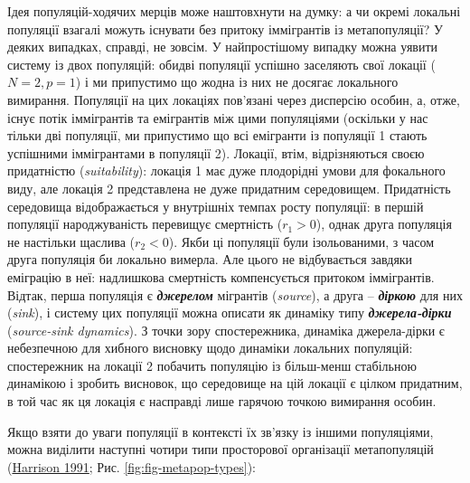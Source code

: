 \documentclass[
  11pt,
]{book}
\begin{document}
Ідея популяцій-ходячих мерців може наштовхнути на думку: а чи окремі локальні популяції взагалі можуть існувати без притоку іммігрантів із метапопуляції? У деяких випадках, справді, не зовсім. У найпростішому випадку можна уявити систему із двох популяцій: обидві популяції успішно заселяють свої локації (\(N = 2, p=1\)) і ми припустимо що жодна із них не досягає локального вимирання. Популяції на цих локаціях пов'язані через дисперсію особин, а, отже, існує потік іммігрантів та емігрантів між цими популяціями (оскільки у нас тільки дві популяції, ми припустимо що всі емігранти із популяції 1 стають успішними іммігрантами в популяції 2). Локації, втім, відрізняються своєю придатністю (\emph{suitability}): локація 1 має дуже плодорідні умови для фокального виду, але локація 2 представлена не дуже придатним середовищем. Придатність середовища відображається у внутрішніх темпах росту популяції: в першій популяції народжуваність перевищує смертність (\(r_1 > 0\)), однак друга популяція не настільки щаслива (\(r_2 < 0\)). Якби ці популяції були ізольованими, з часом друга популяція би локально вимерла. Але цього не відбувається завдяки еміграцію в неї: надлишкова смертність компенсується притоком іммігрантів. Відтак, перша популяція є \textbf{\emph{джерелом}} мігрантів (\emph{source}), а друга -- \textbf{\emph{діркою}} для них (\emph{sink}), і систему цих популяції можна описати як динаміку типу \textbf{\emph{джерела-дірки}} (\emph{source-sink dynamics}). З точки зору спостережника, динаміка джерела-дірки є небезпечною для хибного висновку щодо динаміки локальних популяцій: спостережник на локації 2 побачить популяцію із більш-менш стабільною динамікою і зробить висновок, що середовище на цій локації є цілком придатним, в той час як ця локація є насправді лише гарячою точкою вимирання особин.

Якщо взяти до уваги популяції в контексті їх зв'язку із іншими популяціями, можна виділити наступні чотири типи просторової організації метапопуляцій (\href{htpps://doi.org/10.1111/j.1095-8312.1991.tb00552.x}{Harrison 1991}; Рис. \ref{fig:fig-metapop-types}):
\end{document}
